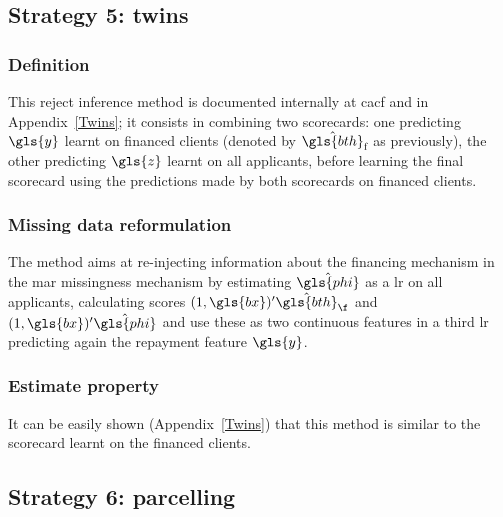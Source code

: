 \subsection{Strategy 5: twins}

\subsubsection{Definition}
This {reject inference} method is documented internally at \gls{cacf} and in Appendix~\ref{Twins}; it consists in combining two scorecards: one predicting $\gls{y}$ learnt on financed clients (denoted by $\hat{\gls{bth}}_{\text{f}}$ as previously), the other predicting $\gls{z}$ learnt on all applicants, before learning the final scorecard using the predictions made by both scorecards on financed clients.

\subsubsection{Missing data reformulation}
The method aims at re-injecting information about the financing mechanism in the \gls{mar} missingness mechanism by estimating $\hat{\gls{phi}}$ as a \gls{lr} on all applicants, calculating \gls{score}s $(1,\gls{bx})' \hat{\gls{bth}}_\f$ and $(1,\gls{bx})' \hat{\gls{phi}}$ and use these as two continuous features in a third \gls{lr} predicting again the repayment feature $\gls{y}$.

\subsubsection{Estimate property}
It can be easily shown (Appendix~\ref{Twins}) that
this method is similar to the scorecard learnt on the financed clients.

\subsection{Strategy 6: parcelling} \label{subsec:parcel}

